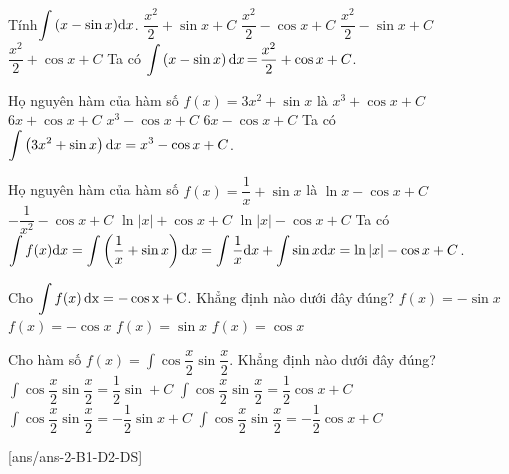 \begin{ex}%
	Tính$\displaystyle\int{\left(x-\sin x\right)}{\rm{d}}x$.
	\choice
	{$\dfrac{x^2}{2}+\sin x+C$}
	{$\dfrac{x^2}{2}-\cos x+C$}
	{$\dfrac{x^2}{2}-\sin x+C$}
	{\True $\dfrac{x^2}{2}+\cos x+C$}
\loigiai
{
	Ta có $\displaystyle\int{\left(x-\sin x\right){\rm{d}}x\,\rm{=}\,}\dfrac{x^2}{2}+\cos x+C$.}
	\end{ex}
\begin{ex}%
	Họ nguyên hàm của hàm số $f(x)=3x^2+\sin x$ là
	\choice
	{$x^3+\cos x+C$}
	{$6x+\cos x+C$}
	{\True $x^3-\cos x+C$}
	{$6x-\cos x+C$}
	\loigiai
	{
		Ta có $\displaystyle\int\left(3x^2+\sin x\right){\rm{d}}x=x^3-\cos x+C$.}
\end{ex}
\begin{ex}%
	Họ nguyên hàm của hàm số $ f(x)=\dfrac{1}{x}+\sin x$ là
	\choice
	{$\ln x-\cos x+C$}
	{$-\dfrac{1}{x^2}-\cos x+C$}
	{$\ln \left| x\right|+\cos x+C$}
	{\True $\ln \left| x\right|-\cos x+C$}
	\loigiai
	{
		Ta có $\displaystyle\int{f(x){\rm{d}}x}=\displaystyle\int{\left(\dfrac{1}{x}+\sin x\right){\rm{d}}x}=\displaystyle\int{\dfrac{1}{x}{\rm{d}}x}+\displaystyle\int{\sin x{\rm{d}}x}=\ln \left| x\right|-\cos x+C$.}
\end{ex}
\begin{ex}%
	Cho $\displaystyle\int{f(x)}\,\rm{d}x=-\cos x+C$. Khẳng định nào dưới đây đúng?
	\choice
	{$ f(x)=-\sin x$}
	{$ f(x)=-\cos x$}
	{\True $ f(x)=\sin x$}
	{$ f(x)=\cos x$}
\end{ex}
\begin{ex}%
	Cho hàm số $ f(x)=\displaystyle\int{\cos\dfrac{x}{2}\sin\dfrac{x}{2}}$. Khẳng định nào dưới đây đúng?
	\choice
	{$\displaystyle\int{\cos\dfrac{x}{2}\sin\dfrac{x}{2}}=\dfrac{1}{2}\sin+C$}
	{$\displaystyle\int{\cos\dfrac{x}{2}\sin\dfrac{x}{2}}=\dfrac{1}{2}\cos x+C$}
	{$\displaystyle\int{\cos\dfrac{x}{2}\sin\dfrac{x}{2}}=-\dfrac{1}{2}\sin x+C$}
	{\True $\displaystyle\int{\cos\dfrac{x}{2}\sin\dfrac{x}{2}}=-\dfrac{1}{2}\cos x+C$}
\end{ex}
[ans/ans-2-B1-D2-DS]
\TNTF

